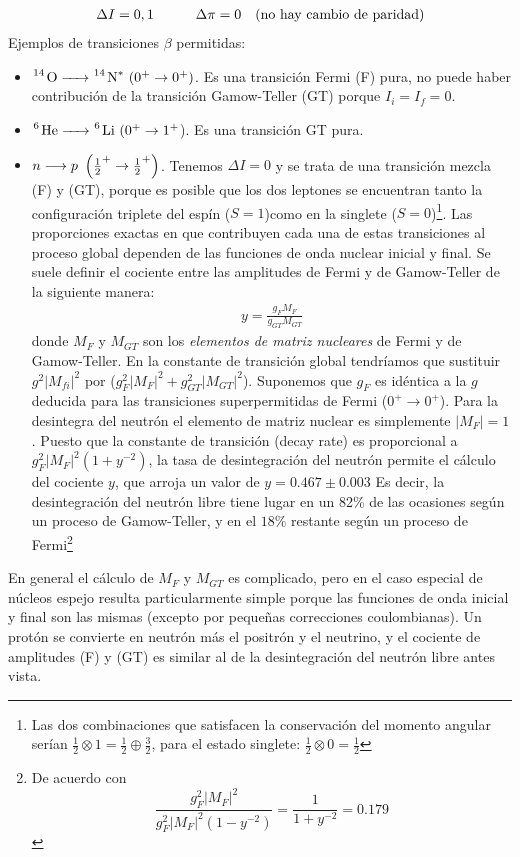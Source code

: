 \begin{eqnarray}
	\Delta I =0,1 \quad \quad \quad \Delta \pi = 0 \quad (\text{no hay cambio de paridad})
\end{eqnarray}
Ejemplos de transiciones $\beta$ permitidas:

\begin{itemize}
	\item $\ce{^14 O -> ^14 N^*} \ (0^+\rightarrow0^+)$. Es una transición Fermi (F) pura, no puede haber contribución de la transición Gamow-Teller (GT) porque $I_i=I_f=0$.
	\item $\ce{^6 He -> ^6  Li}  \ (0^+\rightarrow1^+$). Es una transición GT pura.
	\item $n\longrightarrow p \ \parentesis{\frac{1}{2}^+\rightarrow \frac{1}{2}^+}$. Tenemos $\Delta I = 0$ y se trata de una transición mezcla (F) y (GT), porque es posible que los dos leptones se encuentran tanto la configuración triplete del espín ($S=1$)como en la singlete ($S=0$)\footnote{Las dos combinaciones que satisfacen la conservación del momento angular serían $\frac{1}{2}\otimes 1=\frac{1}{2}\oplus \frac{3}{2}$, para el estado singlete: $\frac{1}{2}\otimes 0=\frac{1}{2}$}. Las proporciones exactas en que contribuyen cada una de estas transiciones al proceso global dependen de las funciones de onda nuclear inicial y final. Se suele definir el cociente entre las amplitudes de Fermi y de Gamow-Teller de la siguiente manera:
	\begin{eqnarray}
		y=\frac{g_FM_F}{g_{GT}M_{GT}}
	\end{eqnarray}
	donde $M_F$ y $M_{GT}$ son los \textit{elementos de matriz nucleares} de Fermi y de Gamow-Teller. En la constante de transición global tendríamos que sustituir $g^2 |M_{fi}|^2$ por ($g_F^2|M_F|^2+g_{GT}^2|M_{GT}|^2$). Suponemos que $g_F$ es idéntica a la $g$ deducida para las transiciones superpermitidas de Fermi ($0^+\rightarrow 0^+$). Para la desintegra del neutrón el elemento de matriz nuclear es simplemente $|M_F|=1$. Puesto que la constante de transición (decay rate) es proporcional a $g_F^2 |M_F|^2 (1+y^{-2})$, la tasa de desintegración del neutrón permite el cálculo del cociente $y$, que arroja un valor de $y=0.467\pm 0.003$ Es decir, la desintegración del neutrón libre tiene lugar en un 82\% de las ocasiones según un proceso de Gamow-Teller, y en el $18\%$ restante según un proceso de Fermi\footnote{De acuerdo con \begin{equation*} \frac{g_F^2 |M_F|^2}{g_F^2 |M_F|^2 (1-y^{-2})} = \frac{1}{1+y^{-2}} = 0.179  \end{equation*}}
	
\end{itemize}
En general el cálculo de $M_F$ y $M_{GT}$ es complicado, pero en el caso especial de núcleos espejo resulta particularmente simple porque las funciones de onda inicial y final son las mismas (excepto por pequeñas correcciones coulombianas). Un protón se convierte en neutrón más el positrón y el neutrino, y el cociente de amplitudes (F) y (GT) es similar al de la desintegración del neutrón libre antes vista. 

